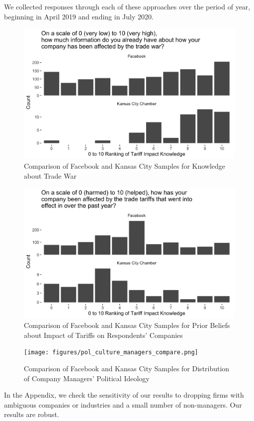 \documentclass{article}
\begin{document}
We collected responses through each of these approaches over the period of year, beginning in April 2019 and ending in July 2020. 

\begin{figure}
    \centering
    \includegraphics[width=0.7\linewidth]{figures/trade_know.png}
    \caption{Comparison of Facebook and Kansas City Samples for Knowledge about Trade War}
    \label{compknow}
\end{figure}

\begin{figure}
    \centering
    \includegraphics[width=0.7\linewidth]{figures/trade_hurt.png}
    \caption{Comparison of Facebook and Kansas City Samples for Prior Beliefs about Impact of Tariffs on Respondents' Companies}
    \label{comphurt}
\end{figure}

\begin{figure}
    \centering
    \texttt{[image: figures/pol\_culture\_managers\_compare.png]}
    \caption{Comparison of Facebook and Kansas City Samples for Distribution of Company Managers' Political Ideology}
    \label{comppol}
\end{figure}

In the Appendix, we check the sensitivity of our results to dropping firms with ambiguous companies or industries and a small number of non-managers. Our results are robust.
\end{document}
